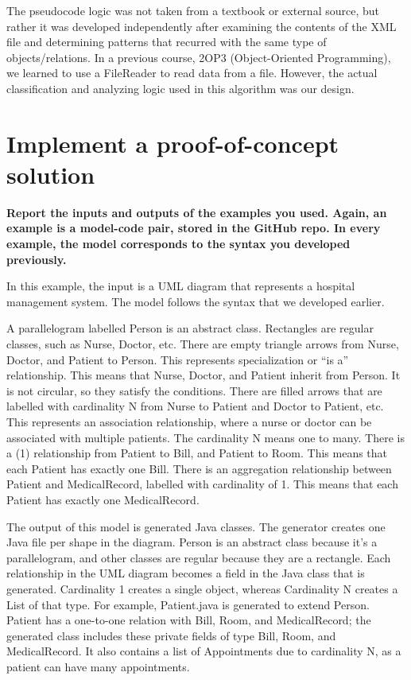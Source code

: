 The pseudocode logic was not taken from a textbook or external source, but rather it was developed independently after examining the contents of the XML file and determining patterns that recurred with the same type of objects/relations. In a previous course, 2OP3 (Object-Oriented Programming), we learned to use a FileReader to read data from a file. However, the actual classification and analyzing logic used in this algorithm was our design.

\newpage

\section{Implement a proof-of-concept solution}

\textbf{Report the inputs and outputs of the examples you used. Again, an example is a model-code pair, stored in the GitHub repo. In every example, the model corresponds to the syntax you developed previously.}

In this example, the input is a UML diagram that represents a hospital management system. The model follows the syntax that we developed earlier. 

A parallelogram labelled Person is an abstract class. Rectangles are regular classes, such as Nurse, Doctor, etc. There are empty triangle arrows from Nurse, Doctor, and Patient to Person. This represents specialization or “is a” relationship. This means that Nurse, Doctor, and Patient inherit from Person. It is not circular, so they satisfy the conditions. There are filled arrows that are labelled with cardinality N from Nurse to Patient and Doctor to Patient, etc. This represents an association relationship, where a nurse or doctor can be associated with multiple patients. The cardinality N means one to many. There is a (1) relationship from Patient to Bill, and Patient to Room. This means that each Patient has exactly one Bill. There is an aggregation relationship between Patient and MedicalRecord, labelled with cardinality of 1. This means that each Patient has exactly one MedicalRecord. 

The output of this model is generated Java classes. The generator creates one Java file per shape in the diagram. Person is an abstract class because it’s a parallelogram, and other classes are regular because they are a rectangle. Each relationship in the UML diagram becomes a field in the Java class that is generated. Cardinality 1 creates a single object, whereas Cardinality N creates a List of that type. For example, Patient.java is generated to extend Person. Patient has a one-to-one relation with Bill, Room, and MedicalRecord; the generated class includes these private fields of type Bill, Room, and MedicalRecord. It also contains a list of Appointments due to cardinality N, as a patient can have many appointments. 

